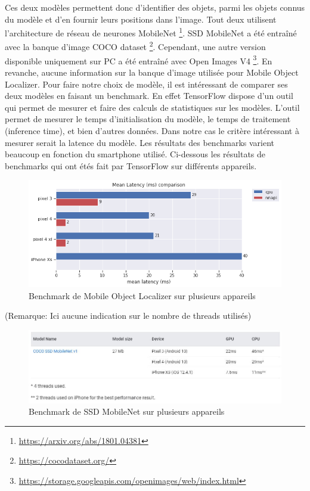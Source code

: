 \documentclass[UTF8]{EPURapport}
\begin{document}
Ces deux modèles permettent donc d'identifier des objets, parmi les objets connus du modèle et d'en fournir leurs positions dans l'image. Tout deux utilisent l'architecture de réseau de neurones MobileNet \footnote{\url{https://arxiv.org/abs/1801.04381}}. SSD MobileNet a été entraîné avec la banque d'image COCO dataset \footnote{\url{https://cocodataset.org/}}. Cependant, une autre version disponible uniquement sur PC a été entraîné avec Open Images V4 \footnote{\url{https://storage.googleapis.com/openimages/web/index.html}}. En revanche, aucune information sur la banque d'image utilisée pour Mobile Object Localizer.
Pour faire notre choix de modèle, il est intéressant de comparer ses deux modèles en faisant un benchmark. En effet TensorFlow dispose d'un outil qui permet de mesurer et faire des calculs de statistiques sur les modèles. L'outil permet de mesurer le temps d'initialisation du modèle, le temps de traitement (inference time), et bien d'autres données. Dans notre cas le critère intéressant à mesurer serait la latence du modèle. Les résultats des benchmarks varient beaucoup en fonction du smartphone utilisé. Ci-dessous les résultats de benchmarks qui ont étés fait par TensorFlow sur différents appareils.

\begin{figure}[h!]
\centering
  \includegraphics[width=\textwidth]{images/bench_mol.png}
  \caption{Benchmark de Mobile Object Localizer sur plusieurs appareils}
  \label{fig:benchmol}
\end{figure}

(Remarque: Ici aucune indication sur le nombre de threads utilisés)

\begin{figure}[h!]
\centering
  \includegraphics[width=\textwidth]{images/bench_ssd_mobilenet.jpg}
  \caption{Benchmark de SSD MobileNet sur plusieurs appareils}
  \label{fig:benchssdmobilenet}
\end{figure}
\end{document}
